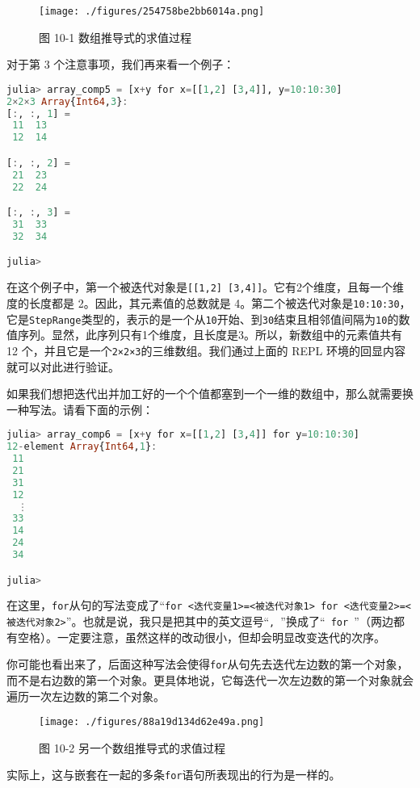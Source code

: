 \begin{figure}[ht]
\centering
\texttt{[image: ./figures/254758be2bb6014a.png]}
\caption{图 10-1 数组推导式的求值过程} \label{fig_JuCAS6_1}
\end{figure}

对于第 3 个注意事项，我们再来看一个例子：

\begin{lstlisting}[language=julia]
julia> array_comp5 = [x+y for x=[[1,2] [3,4]], y=10:10:30]
2×2×3 Array{Int64,3}:
[:, :, 1] =
 11  13
 12  14

[:, :, 2] =
 21  23
 22  24

[:, :, 3] =
 31  33
 32  34

julia> 
\end{lstlisting}

在这个例子中，第一个被迭代对象是\verb`[[1,2] [3,4]]`。它有2个维度，且每一个维度的长度都是 2。因此，其元素值的总数就是 4。第二个被迭代对象是\verb`10:10:30`，它是\verb`StepRange`类型的，表示的是一个从\verb`10`开始、到\verb`30`结束且相邻值间隔为\verb`10`的数值序列。显然，此序列只有1个维度，且长度是3。所以，新数组中的元素值共有 12 个，并且它是一个\verb`2×2×3`的三维数组。我们通过上面的 REPL 环境的回显内容就可以对此进行验证。

如果我们想把迭代出并加工好的一个个值都塞到一个一维的数组中，那么就需要换一种写法。请看下面的示例：

\begin{lstlisting}[language=julia]
julia> array_comp6 = [x+y for x=[[1,2] [3,4]] for y=10:10:30]
12-element Array{Int64,1}:
 11
 21
 31
 12
  ⋮
 33
 14
 24
 34

julia> 
\end{lstlisting}

在这里，\verb`for`从句的写法变成了“\verb`for <迭代变量1>=<被迭代对象1> for <迭代变量2>=<被迭代对象2>`”。也就是说，我只是把其中的英文逗号“\verb`, `”换成了“\verb` for `”（两边都有空格）。一定要注意，虽然这样的改动很小，但却会明显改变迭代的次序。

你可能也看出来了，后面这种写法会使得\verb`for`从句先去迭代左边数的第一个对象，而不是右边数的第一个对象。更具体地说，它每迭代一次左边数的第一个对象就会遍历一次左边数的第二个对象。

\begin{figure}[ht]
\centering
\texttt{[image: ./figures/88a19d134d62e49a.png]}
\caption{图 10-2 另一个数组推导式的求值过程} \label{fig_JuCAS6_2}
\end{figure}

实际上，这与嵌套在一起的多条\verb`for`语句所表现出的行为是一样的。

